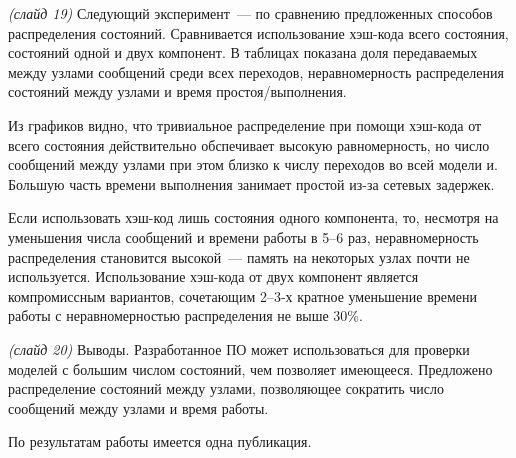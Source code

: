 \documentclass[a4paper,12pt,notitlepage]{article}
\begin{document}

\emph{(слайд 19)} Следующий эксперимент~--- по сравнению предложенных способов
распределения состояний. Сравнивается использование хэш-кода всего состояния, состояний
одной и двух компонент. В таблицах показана доля передаваемых между узлами сообщений среди
всех переходов, неравномерность распределения состояний между узлами и время
простоя/выполнения.

Из графиков видно, что тривиальное распределение при помощи хэш-кода от всего состояния
действительно обспечивает высокую равномерность, но число сообщений между узлами при этом
близко к числу переходов во всей модели и. Большую часть времени выполнения занимает
простой из-за сетевых задержек.

Если использовать хэш-код лишь состояния одного компонента, то, несмотря на уменьшения
числа сообщений и времени работы в 5--6 раз, неравномерность распределения становится
высокой~--- память на некоторых узлах почти не используется. Использование хэш-кода от
двух компонент является компромиссным вариантов, сочетающим 2--3-х кратное уменьшение
времени работы с неравномерностью распределения не выше 30\%.

\emph{(слайд 20)} Выводы. Разработанное ПО может использоваться для проверки моделей с
большим числом состояний, чем позволяет имеющееся. Предложено распределение состояний
между узлами, позволяющее сократить число сообщений между узлами и время работы.

По результатам работы имеется одна публикация.
\end{document}
